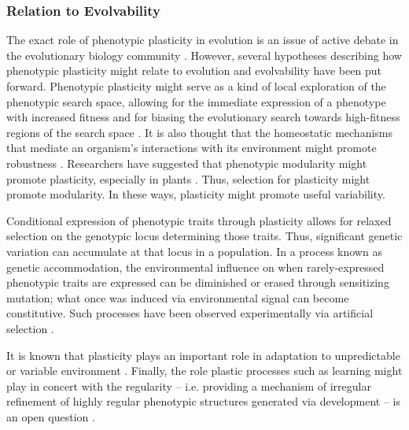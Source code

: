 \subsubsection{Relation to Evolvability}

The exact role of phenotypic plasticity in evolution is an issue of active debate in the evolutionary biology community \cite{Pigliucci2008IsEvolvable}. However, several hypotheses describing how phenotypic plasticity might relate to evolution and evolvability have been put forward. Phenotypic plasticity might serve as a kind of local exploration of the phenotypic search space, allowing for the immediate expression of a phenotype with increased fitness and for biasing the evolutionary search towards high-fitness regions of the search space \cite{Downing2012HeterochronousBaldwinism}. It is also thought that the homeostatic mechanisms that mediate an organism's interactions with its environment might promote robustness \cite{Moczek2011TheInnovation}.\mindmapmark{\robustnessplasticity} Researchers have suggested that phenotypic modularity might promote plasticity, especially in plants \cite{Schlichting1986ThePlants, DeKroon2005APlants}. Thus, selection for plasticity might promote modularity.\mindmapmark{\modularityplasticity} In these ways, plasticity might promote useful variability.

Conditional expression of phenotypic traits through plasticity allows for relaxed selection on the genotypic locus determining those traits. Thus, significant genetic variation can accumulate at that locus in a population.\mindmapmark{\interindividualdegeneracyrobustness} In a process known as genetic accommodation, the environmental influence on when rarely-expressed phenotypic traits are expressed can be diminished or erased through sensitizing mutation; what once was induced via environmental signal can become constitutive. Such processes have been observed experimentally via artificial selection \cite{Moczek2011TheInnovation}.

It is known that plasticity plays an important role in adaptation to unpredictable or variable environment \cite{Fusco2010PhenotypicConcepts}. Finally, the role plastic processes such as learning might play in concert with the regularity -- i.e. providing a mechanism of irregular refinement of highly regular phenotypic structures generated via development -- is an open question  \cite{Clune2011OnRegularity}.\mindmapmark{\usefulvariationregularitycomplexificationplasticity}\mindmapmark{\usefulvariationregularitycomplexification}

